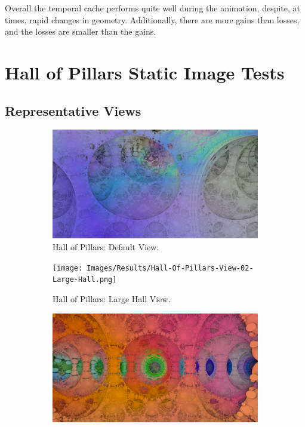Overall the temporal cache performs quite well during the animation, despite, at times, rapid changes in geometry. Additionally, there are more gains than losses, and the losses are smaller than the gains.

\section{Hall of Pillars Static Image Tests}

\subsection{Representative Views}

\begin{figure}[ht]
	\centering

	\begin{subfigure}[c]{0.3\linewidth}
		\includegraphics[width=\linewidth, frame]{Images/Results/Hall-Of-Pillars-View-01-Default.png}
		\caption{Hall of Pillars: Default View.}
		\label{figure:hall-of-pillars-view-01-default}
	\end{subfigure}
	\hfill
	\begin{subfigure}[c]{0.3\linewidth}
		\texttt{[image: Images/Results/Hall-Of-Pillars-View-02-Large-Hall.png]}
		\caption{Hall of Pillars: Large Hall View.}
		\label{figure:hall-of-pillars-view-02-large-hall}
	\end{subfigure}
	\hfill
	\begin{subfigure}[c]{0.3\linewidth}
		\includegraphics[width=\linewidth, frame]{Images/Results/Hall-Of-Pillars-View-03-Corridor-Of-Bottlenecks.png}

\end{subfigure}
\end{figure}
